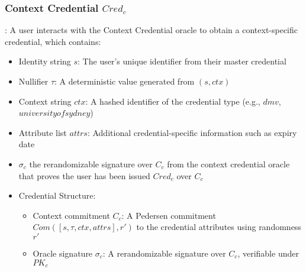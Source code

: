 \subsubsection{Context Credential $Cred_c$}: 
A user interacts with the Context Credential oracle to obtain a context-specific credential, which contains:
\begin{itemize}
    \item Identity string $s$: The user's unique identifier from their master credential
    \item Nullifier $\tau$: A deterministic value generated from $(s, ctx)$
    \item Context string $ctx$: A hashed identifier of the credential type (e.g., $dmv$, $universityofsydney$)
    \item Attribute list $attrs$: Additional credential-specific information such as expiry date
    \item $\sigma_c$ the rerandomizable signature over $C_c$ from the context credential oracle that proves the user has been issued $Cred_c$ over $C_c$
    \item Credential Structure:
    \begin{itemize}
        \item Context commitment $C_c$: A Pedersen commitment $Com([s, \tau, ctx, attrs],r')$ to the credential attributes using randomness $r'$
        \item Oracle signature $\sigma_c$: A rerandomizable signature over $C_c$, verifiable under $PK_c$
    \end{itemize}
    
\end{itemize}


